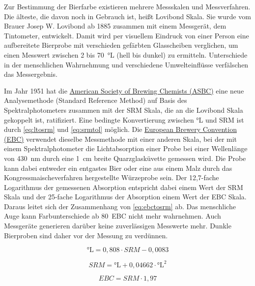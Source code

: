 \documentclass[a4paper,parskip=half]{scrartcl}
\newcommand{\EBC}{\mathit{EBC}}
\newcommand{\SRM}{\mathit{SRM}}
\begin{document}
Zur Bestimmung der Bierfarbe existieren mehrere Messskalen und Messverfahren. Die älteste, die davon noch in Gebrauch ist, heißt Lovibond Skala. Sie wurde vom Brauer Josep W. Lovibond ab 1885 zusammen mit einem Messgerät, dem Tintometer, entwickelt. Damit wird per visuellem Eindruck von einer Person eine aufbereitete Bierprobe mit verschieden gefärbten Glasscheiben verglichen, um einen Messwert zwischen 2 bis 70~°L (hell bis dunkel) zu ermitteln. Unterschiede in der menschlichen Wahrnehmung und verschiedene Umwelteinflüsse verfälschen das Messergebnis. \parencites{KrausWeyermann2021a}{Shellhammer2009}

Im Jahr 1951 hat die \href{https://www.asbcnet.org}{American Society of Brewing Chemists (ASBC)} eine neue Analysemethode (Standard Reference Method) auf Basis des Spektralphotometers zusammen mit der SRM Skala, die an die Lovibond Skala gekoppelt ist, ratifiziert. Eine bedingte Konvertierung zwischen °L und SRM ist durch \autoref{eq:ltosrm} und \autoref{eq:srmtol} möglich. Die \href{https://europeanbreweryconvention.eu}{European Brewery Convention (EBC)} verwendet dieselbe Messmethode mit einer anderen Skala, bei der mit einem Spektralphotometer die Lichtabsorption einer Probe bei einer Wellenlänge von 430~nm durch eine 1~cm breite Quarzglasküvette gemessen wird. Die Probe kann dabei entweder ein entgastes Bier oder eine aus einem Malz durch das Kongressmaischeverfahren hergestellte Würzeprobe sein. Der 12,7-fache Logarithmus der gemessenen Absorption entspricht dabei einem Wert der SRM Skala und der 25-fache Logarithmus der Absorption einem Wert der EBC Skala. Daraus leitet sich der Zusammenhang von \autoref{eq:ebctosrm} ab. Das menschliche Auge kann Farbunterschiede ab 80~EBC nicht mehr wahrnehmen. Auch Messgeräte generieren darüber keine zuverlässigen Messwerte mehr. Dunkle Bierproben sind daher vor der Messung zu verdünnen. \parencites{KrausWeyermann2021a}{Shellhammer2009}

\begin{equation}
\textrm{°L} = 0,808 \cdot \SRM - 0,0083
\label{eq:ltosrm}
\end{equation}

\begin{equation}
\SRM = \textrm{°L} + 0,04662 \cdot \textrm{°L}^2
\label{eq:srmtol}
\end{equation}

\begin{equation}
\EBC = \SRM \cdot 1,97
\label{eq:ebctosrm}
\end{equation}
\end{document}

